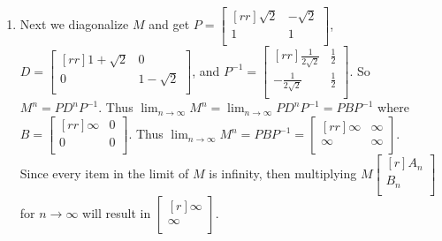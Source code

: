 \documentclass[12pt]{article}
\theoremstyle{definition}
\theoremstyle{plain}
\begin{document}
\begin{enumerate}
\begin{enumerate}
\item Next we diagonalize $M$ and get $P=\begin{bmatrix}[rr]\sqrt{2}&-\sqrt{2}\\1&1\\\end{bmatrix}$, $D=\begin{bmatrix}[rr]1+\sqrt{2}&0\\0&1-\sqrt{2}\\\end{bmatrix}$, and $P^{-1}=\begin{bmatrix}[rr]\frac{1}{2\sqrt{2}}&\frac{1}{2}\\-\frac{1}{2\sqrt{2}}&\frac{1}{2}\\\end{bmatrix}$. So $M^n=PD^nP^{-1}$. Thus $\lim_{n\rightarrow\infty}M^n=\lim_{n\rightarrow\infty}PD^nP^{-1}=PBP^{-1}$ where $B=\begin{bmatrix}[rr]\infty &0\\0&0\\\end{bmatrix}$.
Thus $\lim_{n\rightarrow\infty}M^n = PBP^{-1}=\begin{bmatrix}[rr]\infty&\infty\\\infty&\infty\\\end{bmatrix}$.\\
Since every item in the limit of $M$ is infinity, then multiplying $M\begin{bmatrix}[r]A_n\\B_n\\\end{bmatrix}$ for $n\rightarrow\infty$ will result in $\begin{bmatrix}[r]\infty\\\infty\\\end{bmatrix}$.\\ 
\end{enumerate}


\end{enumerate}
\end{document}
